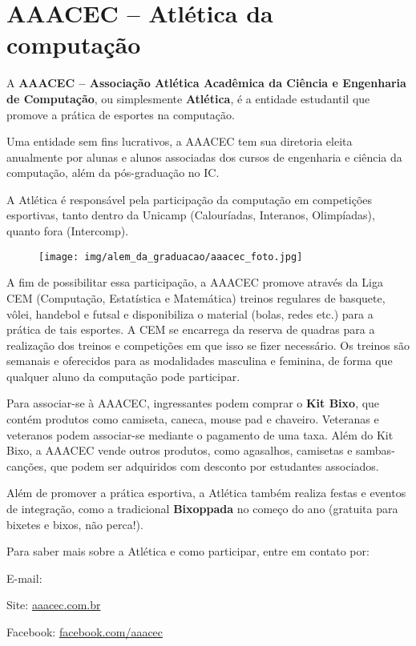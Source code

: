 
\section{AAACEC -- Atlética da computação}

A \textbf{AAACEC -- Associação Atlética Acadêmica da Ciência e Engenharia de
Computação}, ou simplesmente \textbf{Atlética}, é a entidade estudantil que
promove a prática de esportes na computação.

Uma entidade sem fins lucrativos, a AAACEC tem sua diretoria eleita anualmente
por alunas e alunos associadas dos cursos de engenharia e ciência da
computação, além da pós-graduação no IC.

A Atlética é responsável pela participação da computação em competições
esportivas, tanto dentro da Unicamp (Calouríadas, Interanos, Olimpíadas),
quanto fora (Intercomp).

\begin{figure}[H]
  \centering
  \texttt{[image: img/alem\_da\_graduacao/aaacec\_foto.jpg]}
\end{figure}

A fim de possibilitar essa participação, a AAACEC promove através da Liga CEM
(Computação, Estatística e Matemática) treinos regulares de basquete, vôlei,
handebol e futsal e disponibiliza o material (bolas, redes etc.) para a
prática de tais esportes. A CEM se encarrega da reserva de quadras para
a realização dos treinos e competições em que isso se fizer necessário.
Os treinos são semanais e oferecidos para as modalidades masculina e
feminina, de forma que qualquer aluno da computação pode participar.

Para associar-se à AAACEC, ingressantes podem comprar o \textbf{Kit Bixo},
que contém produtos co\-mo camiseta, caneca, mouse pad e chaveiro. Veteranas
e veteranos podem associar-se mediante o pagamento de uma taxa. Além do Kit
Bixo, a AAACEC vende outros produtos, como agasalhos, camisetas e sambas-
canções, que podem ser adquiridos com desconto por estudantes associados.

Além de promover a prática esportiva, a Atlética também realiza festas e
eventos de integração, como a tradicional \textbf{Bixoppada} no
começo do ano (gratuita para bixetes e bixos, não perca!).

Para saber mais sobre a Atlética e como participar, entre em contato por:
\begin{compactitemize}
\item E-mail: 
\item Site: \url{aaacec.com.br}
\item Facebook: \url{facebook.com/aaacec}
\end{compactitemize}
